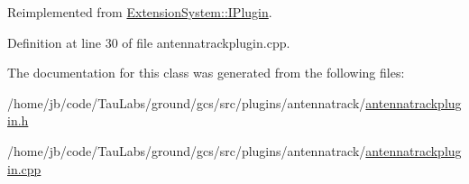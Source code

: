 \-Reimplemented from \hyperlink{class_extension_system_1_1_i_plugin_a65c16ebd3a6e89918a99af6515fe68cb}{\-Extension\-System\-::\-I\-Plugin}.



\-Definition at line 30 of file antennatrackplugin.\-cpp.



\-The documentation for this class was generated from the following files\-:\begin{DoxyCompactItemize}
\item 
/home/jb/code/\-Tau\-Labs/ground/gcs/src/plugins/antennatrack/\hyperlink{antennatrackplugin_8h}{antennatrackplugin.\-h}\item 
/home/jb/code/\-Tau\-Labs/ground/gcs/src/plugins/antennatrack/\hyperlink{antennatrackplugin_8cpp}{antennatrackplugin.\-cpp}\end{DoxyCompactItemize}

